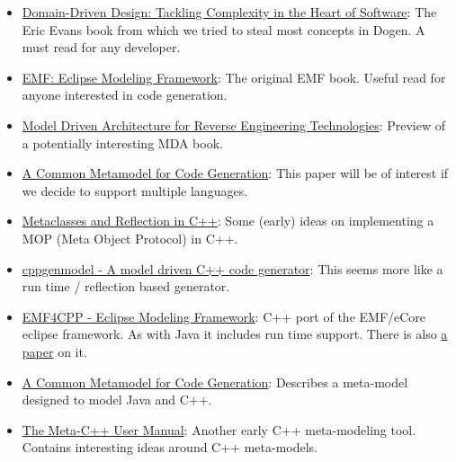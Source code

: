 \documentclass[11pt]{article}
\begin{document}
\begin{itemize}
\item \href{http://www.amazon.co.uk/Domain-Driven-Design-Tackling-Complexity-ebook/dp/B00794TAUG/ref\%3Dsr_1_2?ie\%3DUTF8&qid\%3D1368380797&sr\%3D8-2&keywords\%3Dmodel\%2Bdriven\%2Bdesign}{Domain-Driven Design: Tackling Complexity in the Heart of Software}:
The Eric Evans book from which we tried to steal most concepts in
Dogen. A must read for any developer.
\item \href{http://www.amazon.co.uk/EMF-Eclipse-Modeling-Framework-ebook/dp/B0013TPYVW/ref\%3Dsr_1_2?s\%3Dbooks&ie\%3DUTF8&qid\%3D1368380262&sr\%3D1-2&keywords\%3DEclipse\%2BModeling\%2BFramework\%2B\%255BPaperback\%255D}{EMF: Eclipse Modeling Framework}: The original EMF book. Useful read
for anyone interested in code generation.
\item \href{http://www.scribd.com/doc/78264699/Model-Driven-Architecture-for-Reverse-Engineering-Technologies-Strategic-Directions-and-System-Evolution-Premier-Reference-Source}{Model Driven Architecture for Reverse Engineering Technologies}:
Preview of a potentially interesting MDA book.
\item \href{http://www2.informatik.hu-berlin.de/~piefel/Documents/06CITSA-CMMCG.pdf}{A Common Metamodel for Code Generation}: This paper will be of
interest if we decide to support multiple languages.
\item \href{http://www.vollmann.com/pubs/meta/meta/meta.html}{Metaclasses and Reflection in C++}: Some (early) ideas on
implementing a MOP (Meta Object Protocol) in C++.
\item \href{https://code.google.com/a/eclipselabs.org/p/cppgenmodel/}{cppgenmodel - A model driven C++ code generator}: This seems more
like a run time / reflection based generator.
\item \href{https://code.google.com/p/emf4cpp/}{EMF4CPP - Eclipse Modeling Framework}: C++ port of the EMF/eCore
eclipse framework. As with Java it includes run time support. There
is also \href{http://apps.nabbel.es/dsdm2010/download_files/dsdm2010_senac.pdf}{a paper} on it.
\item \href{http://www2.informatik.hu-berlin.de/~piefel/Documents/06CITSA-CMMCG.pdf}{A Common Metamodel for Code Generation}: Describes a meta-model
designed to model Java and C++.
\item \href{http://marofra.com/oldhomepage/MetaCPlusPlusDoc/metacplusplus-1.html}{The Meta-C++ User Manual}: Another early C++ meta-modeling
tool. Contains interesting ideas around C++ meta-models.

\end{itemize}
\end{document}
